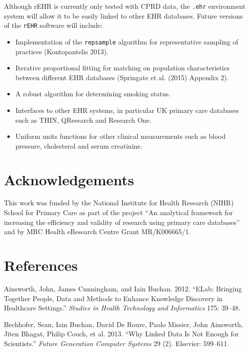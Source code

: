 \documentclass[]{article}
\begin{document}
Although rEHR is currently only tested with CPRD data, the \texttt{.ehr}
environment system will allow it to be easily linked to other EHR
databases. Future versions of the \texttt{rEHR} software will include:

\begin{itemize}
\itemsep1pt\parskip0pt
\item
  Implementation of the \texttt{repsample} algorithm for representative
  sampling of practices (Kontopantelis 2013).
\item
  Iterative proportional fitting for matching on population
  characteristics between different EHR databases (Springate et al.
  (2015) Appendix 2).
\item
  A robust algorithm for determining smoking status.
\item
  Interfaces to other EHR systems, in particular UK primary care
  databases such as THIN, QResearch and Research One.
\item
  Uniform units functions for other clinical measurements such as blood
  pressure, cholesterol and serum creatinine.
\end{itemize}

\section{Acknowledgements}\label{acknowledgements}

This work was funded by the National Institute for Health Research
(NIHR) School for Primary Care as part of the project ``An analytical
framework for increasing the efficiency and validity of research using
primary care databases'' and by MRC Health eResearch Centre Grant
MR/K006665/1.

\section*{References}\label{references}

Ainsworth, John, James Cunningham, and Iain Buchan. 2012. ``ELab:
Bringing Together People, Data and Methods to Enhance Knowledge
Discovery in Healthcare Settings.'' \emph{Studies in Health Technology
and Informatics} 175: 39--48.

Bechhofer, Sean, Iain Buchan, David De Roure, Paolo Missier, John
Ainsworth, Jiten Bhagat, Philip Couch, et al. 2013. ``Why Linked Data Is
Not Enough for Scientists.'' \emph{Future Generation Computer Systems}
29 (2). Elsevier: 599--611.
\end{document}
